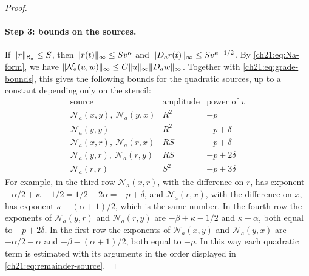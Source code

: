 \begin{proof}
\paragraph{Step 3: bounds on the sources.}
If $\lVert r\rVert_{\mathsf R_a}\le S$, then $\lVert r(t)\rVert_\infty\le Sv^\kappa$ and $\lVert D_ar(t)\rVert_\infty\le Sv^{\kappa-1/2}$. By \eqref{ch21:eq:Na-form}, we have $\lVert \mathcal N_a(u,w)\rVert_\infty\le C\lVert u\rVert_\infty\lVert D_aw\rVert_\infty$. Together with \eqref{ch21:eq:grade-bounds}, this gives the following bounds for the quadratic sources, up to a constant depending only on the stencil:
\[
 \begin{array}{c|c|c}
 \text{source}&\text{amplitude}&\text{power of }v\\ \hline
 \mathcal N_a(x,y),\ \mathcal N_a(y,x)&R^2&-p\\
 \mathcal N_a(y,y)&R^2&-p+\delta\\
 \mathcal N_a(x,r),\ \mathcal N_a(r,x)&RS&-p+\delta\\
 \mathcal N_a(y,r),\ \mathcal N_a(r,y)&RS&-p+2\delta\\
 \mathcal N_a(r,r)&S^2&-p+3\delta
 \end{array}
\]
For example, in the third row $\mathcal N_a(x,r)$, with the difference on $r$, has exponent $-\alpha/2+\kappa-1/2=1/2-2\alpha=-p+\delta$, and $\mathcal N_a(r,x)$, with the difference on $x$, has exponent $\kappa-(\alpha+1)/2$, which is the same number. In the fourth row the exponents of $\mathcal N_a(y,r)$ and $\mathcal N_a(r,y)$ are $-\beta+\kappa-1/2$ and $\kappa-\alpha$, both equal to $-p+2\delta$. In the first row the exponents of $\mathcal N_a(x,y)$ and $\mathcal N_a(y,x)$ are $-\alpha/2-\alpha$ and $-\beta-(\alpha+1)/2$, both equal to $-p$. In this way each quadratic term is estimated with its arguments in the order displayed in \eqref{ch21:eq:remainder-source}.


\end{proof}
